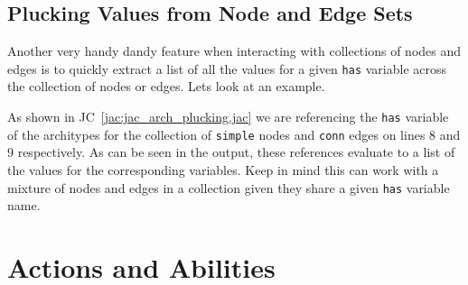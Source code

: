 \subsection{Plucking Values from Node and Edge Sets}

Another very handy dandy feature when interacting with collections of nodes and edges is to quickly extract a list of all the values for a given \lstinline{has} variable across the collection of nodes or edges. Lets look at an example.
\par
{}
\par
{}
\par
As shown in JC~\ref{jac:jac_arch_plucking.jac} we are referencing the \lstinline{has} variable of the architypes for the collection of \lstinline{simple} nodes and \lstinline{conn} edges on lines 8 and 9 respectively. As can be seen in the output, these references evaluate to a list of the values for the corresponding variables. Keep in mind this can work with a mixture of nodes and edges in a collection given they share a given \lstinline{has} variable name.

\section{Actions and Abilities}

\par
{}
\par
{}
\par
{}
\par
{}

\par
{}
\par
{}
\par
{}
\par [Only nodes can have with entry/exit`' and presets]
\par [can leave output (push returns) in node and walker]

\par
{}
